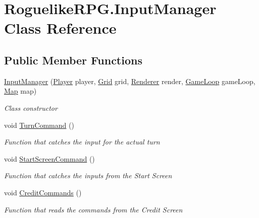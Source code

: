 \hypertarget{class_roguelike_r_p_g_1_1_input_manager}{}\section{Roguelike\+R\+P\+G.\+Input\+Manager Class Reference}
\label{class_roguelike_r_p_g_1_1_input_manager}


 


\subsection*{Public Member Functions}
\begin{DoxyCompactItemize}
\item 
\mbox{\hyperlink{class_roguelike_r_p_g_1_1_input_manager_a638a30fe668a76236a2465c759941e1f}{Input\+Manager}} (\mbox{\hyperlink{class_roguelike_r_p_g_1_1_player}{Player}} player, \mbox{\hyperlink{class_roguelike_r_p_g_1_1_grid}{Grid}} grid, \mbox{\hyperlink{class_roguelike_r_p_g_1_1_renderer}{Renderer}} render, \mbox{\hyperlink{class_roguelike_r_p_g_1_1_game_loop}{Game\+Loop}} game\+Loop, \mbox{\hyperlink{class_roguelike_r_p_g_1_1_map}{Map}} map)
\begin{DoxyCompactList}\small\item\em Class constructor \end{DoxyCompactList}\item 
void \mbox{\hyperlink{class_roguelike_r_p_g_1_1_input_manager_a4cf1240d67c0b5f014eb44a752bd973e}{Turn\+Command}} ()
\begin{DoxyCompactList}\small\item\em Function that catches the input for the actual turn \end{DoxyCompactList}\item 
void \mbox{\hyperlink{class_roguelike_r_p_g_1_1_input_manager_aec0961d74c0742a206f3e0af0cafd2f7}{Start\+Screen\+Command}} ()
\begin{DoxyCompactList}\small\item\em Function that catches the inputs from the Start Screen \end{DoxyCompactList}\item 
void \mbox{\hyperlink{class_roguelike_r_p_g_1_1_input_manager_a320b37790da7ab766eb987471c893a2a}{Credit\+Commands}} ()
\begin{DoxyCompactList}\small\item\em Function that reads the commands from the Credit Screen \end{DoxyCompactList}\end{DoxyCompactItemize}


